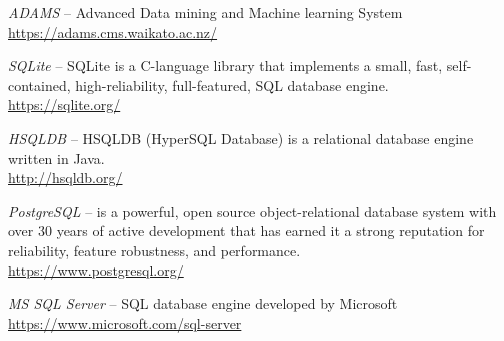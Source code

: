 
\begin{thebibliography}{999}

		\textit{ADAMS} -- Advanced Data mining and Machine learning System \\
		\url{https://adams.cms.waikato.ac.nz/}{}
		
		\textit{SQLite} -- SQLite is a C-language library that implements
		a small, fast, self-contained, high-reliability, full-featured,
		SQL database engine. \\
		\url{https://sqlite.org/}{}

		\textit{HSQLDB} -- HSQLDB (HyperSQL Database) is a relational
		database engine written in Java. \\
		\url{http://hsqldb.org/}{}

		\textit{PostgreSQL} --  is a powerful, open source object-relational
		database system with over 30 years of active development that has
		earned it a strong reputation for reliability, feature robustness,
		and performance.  \\
		\url{https://www.postgresql.org/}{}

		\textit{MS SQL Server} -- SQL database engine developed by Microsoft \\
		\url{https://www.microsoft.com/sql-server}{}

\end{thebibliography}
